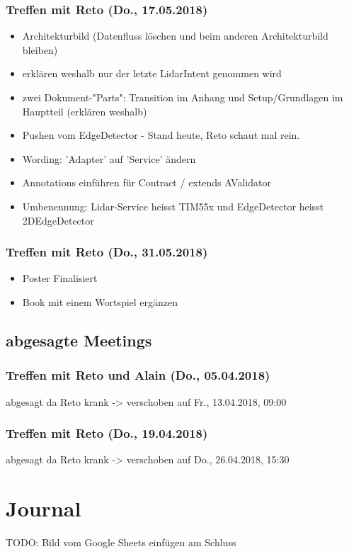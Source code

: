 \subsubsection{Treffen mit Reto (Do., 17.05.2018)}
\begin{itemize}
	\item Architekturbild (Datenfluss löschen und beim anderen Architekturbild bleiben)
	\item erklären weshalb nur der letzte LidarIntent genommen wird
	\item zwei Dokument-"Parts": Transition im Anhang und Setup/Grundlagen im Hauptteil (erklären weshalb)
	\item Pushen vom EdgeDetector - Stand heute, Reto schaut mal rein.
	\item Wording: 'Adapter' auf 'Service' ändern
	\item Annotations einführen für Contract / extends AValidator
	\item Umbenennung: Lidar-Service heisst TIM55x und EdgeDetector heisst 2DEdgeDetector
\end{itemize}

\subsubsection{Treffen mit Reto (Do., 31.05.2018)}
\begin{itemize}
	\item Poster Finalisiert
	\item Book mit einem Wortspiel ergänzen
\end{itemize}

\subsection{abgesagte Meetings}
\subsubsection{Treffen mit Reto und Alain (Do., 05.04.2018)}
abgesagt da Reto krank -> verschoben auf Fr., 13.04.2018, 09:00

\subsubsection{Treffen mit Reto (Do., 19.04.2018)}
abgesagt da Reto krank -> verschoben auf Do., 26.04.2018, 15:30

\section{Journal}
TODO: Bild vom Google Sheets einfügen am Schluss